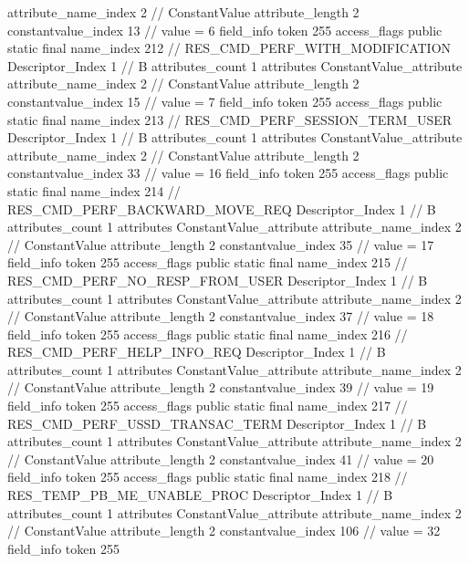 {{{{{{{					attribute_name_index	2		// ConstantValue
					attribute_length	2
					constantvalue_index	13		// value = 6
				}
				}
			}
			field_info {
				token	255
				access_flags	public static final
				name_index	212		// RES_CMD_PERF_WITH_MODIFICATION
				Descriptor_Index	1		// B
				attributes_count	1
				attributes {
				ConstantValue_attribute {
					attribute_name_index	2		// ConstantValue
					attribute_length	2
					constantvalue_index	15		// value = 7
				}
				}
			}
			field_info {
				token	255
				access_flags	public static final
				name_index	213		// RES_CMD_PERF_SESSION_TERM_USER
				Descriptor_Index	1		// B
				attributes_count	1
				attributes {
				ConstantValue_attribute {
					attribute_name_index	2		// ConstantValue
					attribute_length	2
					constantvalue_index	33		// value = 16
				}
				}
			}
			field_info {
				token	255
				access_flags	public static final
				name_index	214		// RES_CMD_PERF_BACKWARD_MOVE_REQ
				Descriptor_Index	1		// B
				attributes_count	1
				attributes {
				ConstantValue_attribute {
					attribute_name_index	2		// ConstantValue
					attribute_length	2
					constantvalue_index	35		// value = 17
				}
				}
			}
			field_info {
				token	255
				access_flags	public static final
				name_index	215		// RES_CMD_PERF_NO_RESP_FROM_USER
				Descriptor_Index	1		// B
				attributes_count	1
				attributes {
				ConstantValue_attribute {
					attribute_name_index	2		// ConstantValue
					attribute_length	2
					constantvalue_index	37		// value = 18
				}
				}
			}
			field_info {
				token	255
				access_flags	public static final
				name_index	216		// RES_CMD_PERF_HELP_INFO_REQ
				Descriptor_Index	1		// B
				attributes_count	1
				attributes {
				ConstantValue_attribute {
					attribute_name_index	2		// ConstantValue
					attribute_length	2
					constantvalue_index	39		// value = 19
				}
				}
			}
			field_info {
				token	255
				access_flags	public static final
				name_index	217		// RES_CMD_PERF_USSD_TRANSAC_TERM
				Descriptor_Index	1		// B
				attributes_count	1
				attributes {
				ConstantValue_attribute {
					attribute_name_index	2		// ConstantValue
					attribute_length	2
					constantvalue_index	41		// value = 20
				}
				}
			}
			field_info {
				token	255
				access_flags	public static final
				name_index	218		// RES_TEMP_PB_ME_UNABLE_PROC
				Descriptor_Index	1		// B
				attributes_count	1
				attributes {
				ConstantValue_attribute {
					attribute_name_index	2		// ConstantValue
					attribute_length	2
					constantvalue_index	106		// value = 32
				}
				}
			}
			field_info {
				token	255
}}}}}
